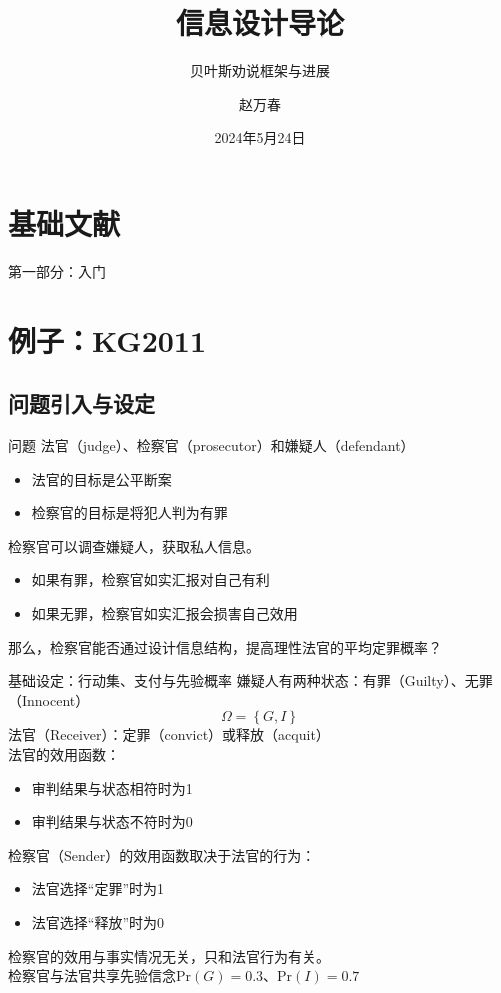 \documentclass{beamer}
\author{赵万春}
\title{信息设计导论}
\subtitle{贝叶斯劝说框架与进展}
\institute{天津财经大学 金融学院}
\date{2024年5月24日}
\begin{document}
\kaishu
\section{基础文献}
\begin{frame}{第一部分：入门}
	
\end{frame}

\section{例子：KG2011}

\subsection{问题引入与设定}

\begin{frame}{问题}
	法官（judge）、检察官（prosecutor）和嫌疑人（defendant）
	\begin{itemize}
		\item 法官的目标是公平断案
		\item 检察官的目标是将犯人判为有罪
	\end{itemize}
	检察官可以调查嫌疑人，获取私人信息。\\
	\begin{itemize}
		\item 如果有罪，检察官如实汇报对自己有利
		\item 如果无罪，检察官如实汇报会损害自己效用
	\end{itemize}
	那么，检察官能否通过设计信息结构，提高理性法官的平均定罪概率？
\end{frame}

\begin{frame}{基础设定：行动集、支付与先验概率}
	嫌疑人有两种状态：有罪（Guilty）、无罪（Innocent）\\
	$$\Omega=\left\lbrace G,I\right\rbrace $$
	法官（Receiver）：定罪（convict）或释放（acquit）\\
	法官的效用函数：
	\begin{itemize}
		\item[] 审判结果与状态相符时为1
		\item[] 审判结果与状态不符时为0
	\end{itemize}
	检察官（Sender）的效用函数取决于法官的行为：
	\begin{itemize}
		\item[] 法官选择“定罪”时为1
		\item[] 法官选择“释放”时为0
	\end{itemize}
	检察官的效用与事实情况无关，只和法官行为有关。\\
	检察官与法官共享先验信念Pr$\left(G\right)=0.3$、Pr$\left(I\right)=0.7$

\end{frame}
\end{document}
